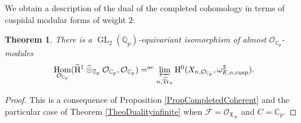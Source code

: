 \documentclass[11pt]{article}
\newcommand{\rae}{\mathrm{ae}}
\newcommand{\cusp}{\mathrm{cusp}}
\newcommand{\wotimes}{\mathbin{\widehat\otimes}}
\numberwithin{equation}{section}
\newtheorem{theo}[prop]{Theorem}
\theoremstyle{definition}
\newcommand{\bb}[1]{\mathbb{#1}}
\newcommand{\n}[1]{\mathcal{#1}}
\newcommand{\f}[1]{\mathfrak{#1}}
\newcommand{\s}[1]{\mathscr{#1}}
\DeclareMathOperator{\GL}{GL}
\DeclareMathOperator{\Tr}{Tr}
\DeclareMathOperator{\Hom}{Hom}
\begin{document}
We obtain a description of the dual of the completed cohomology in terms of cuspidal modular forms of weight $2$:

\begin{theo}
There is a $\GL_2(\bb{Q}_p)$-equivariant isomorphism of almost $\n{O}_{\bb{C}_p}$-modules
\[
\Hom_{\n{O}_{\bb{C}_p}} (\mathrm{\widetilde{H}}^1 \wotimes_{\bb{Z}_p}\n{O}_{\bb{C}_p} , \n{O}_{\bb{C}_p}) =^{\rae} \varprojlim_{n, \widetilde{\Tr}_n} \mathrm{H}^0(X_{n, \n{O}_{\bb{C}_p}}, \omega^2_{E,n,\cusp}).
\]
\end{theo}

\begin{proof}
This is a consequence of Proposition \ref{PropCompletedCoherent} and the particular case of Theorem \ref{TheoDualityinfinite} when $\n{F}= \s{O}_{\f{X}_{\infty}}$ and $C=\bb{C}_p$.
\end{proof}


\end{document}
